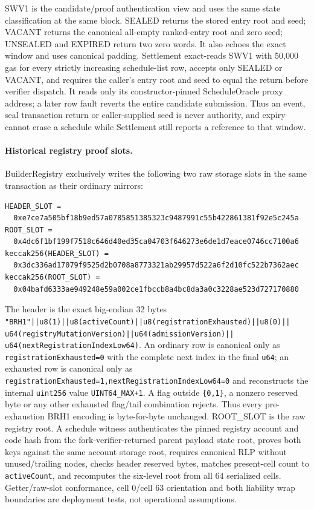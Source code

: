 \documentclass[a4paper,11pt]{article}
\newcommand{\code}[1]{\nolinkurl{#1}}
\begin{document}
SWV1 is the candidate/proof authentication view and uses the same state
classification at the same block.  SEALED returns the stored entry root and
seed; VACANT returns the canonical all-empty ranked-entry root and zero seed;
UNSEALED and EXPIRED return two zero words.  It also echoes the exact window and
uses canonical padding.  Settlement exact-reads SWV1 with 50,000 gas for every
strictly increasing schedule-list row, accepts only SEALED or VACANT, and
requires the caller's entry root and seed to equal the return before verifier
dispatch.  It reads only its constructor-pinned ScheduleOracle proxy address;
a later row fault reverts the entire candidate submission.  Thus an
event, seal transaction return or caller-supplied seed is never authority, and
expiry cannot erase a schedule while Settlement still reports a reference to
that window.

\paragraph{Historical registry proof slots.}
BuilderRegistry exclusively writes the following two raw storage slots in the
same transaction as their ordinary mirrors:
\begin{verbatim}
HEADER_SLOT =
  0xe7ce7a505bf18b9ed57a0785851385323c9487991c55b422861381f92e5c245a
ROOT_SLOT =
  0x4dc6f1bf199f7518c646d40ed35ca04703f646273e6de1d7eace0746cc7100a6
keccak256(HEADER_SLOT) =
  0x3dc336ad17079f9525d2b0708a8773321ab29957d522a6f2d10fc522b7362aec
keccak256(ROOT_SLOT) =
  0x04bafd6333ae949248e59a002ce1fbccb8a4bc8da3a0c3228ae523d727170880
\end{verbatim}
The header is the exact big-endian 32 bytes
\code{"BRH1"||u8(1)||u8(activeCount)||u8(registrationExhausted)||u8(0)||
u64(registryMutationVersion)||u64(admissionVersion)||
u64(nextRegistrationIndexLow64)}.  An ordinary row is canonical only as
\code{registrationExhausted=0} with the complete next index in the final
\code{u64}; an exhausted row is canonical only as
\code{registrationExhausted=1,nextRegistrationIndexLow64=0} and reconstructs
the internal \code{uint256} value \code{UINT64_MAX+1}.  A flag outside
\code{\{0,1\}}, a nonzero reserved byte or any other exhausted flag/tail
combination rejects.  Thus every pre-exhaustion BRH1 encoding is byte-for-byte
unchanged.  ROOT\_SLOT is the raw registry root.  A schedule
witness authenticates the pinned registry account and code hash from the
fork-verifier-returned parent payload state root, proves both keys against the
same account storage root,
requires canonical RLP without unused/trailing nodes, checks header reserved
bytes, matches present-cell count to \code{activeCount}, and recomputes the
six-level root from all 64 serialized cells.  Getter/raw-slot conformance,
cell 0/cell 63 orientation and both liability wrap boundaries are deployment
tests, not operational assumptions.
\end{document}
